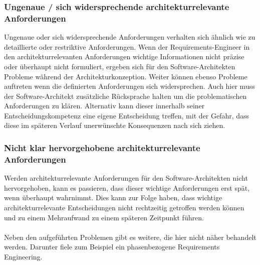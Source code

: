 \subsubsection{Ungenaue / sich widersprechende architekturrelevante Anforderungen}
Ungenaue oder sich widersprechende Anforderungen verhalten sich ähnlich wie zu detaillierte oder restriktive Anforderungen. Wenn der Requirements-Engineer in den architekturrelevanten Anforderungen wichtige Informationen nicht präzise oder überhaupt nicht formuliert, ergeben sich für den Software-Architekten Probleme während der Architekturkonzeption. Weiter können ebenso Probleme auftreten wenn die definierten Anforderungen sich widersprechen. Auch hier muss der Software-Architekt zusätzliche Rücksprache halten um die problematischen Anforderungen zu klären. Alternativ kann dieser innerhalb seiner Entscheidungskompetenz eine eigene Entscheidung treffen, mit der Gefahr, dass diese im späteren Verlauf unerwünschte Konsequenzen nach sich ziehen.

\subsubsection{Nicht klar hervorgehobene architekturrelevante Anforderungen}
Werden architekturrelevante Anforderungen für den Software-Architekten nicht hervorgehoben, kann es passieren, dass dieser wichtige Anforderungen erst spät, wenn überhaupt wahrnimmt. Dies kann zur Folge haben, dass wichtige architekturrelevante Entscheidungen nicht rechtzeitig getroffen werden können und zu einem Mehraufwand zu einem späteren Zeitpunkt führen.\\
\\

Neben den aufgeführten Problemen gibt es weitere, die hier nicht näher behandelt werden. Darunter fiele zum Beispiel ein phasenbezogene Requirements Engineering.
\\